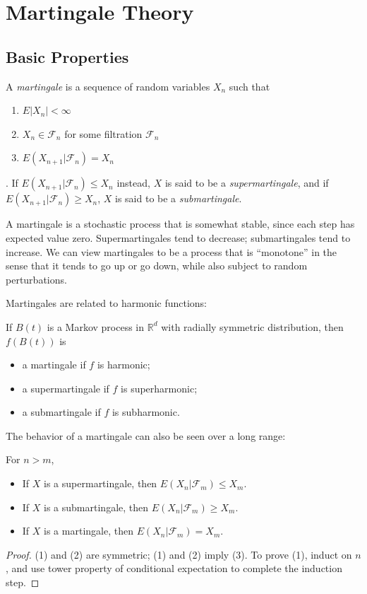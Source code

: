 \section{Martingale Theory}
\subsection{Basic Properties}

\begin{definition}[Martingale]
	\label{defn:martingale}
	A \textit{martingale} is a sequence of random variables $X_n$ such that
	\begin{enumerate}
		\item $E|X_n| < \infty $ 
		\item $X_n \in \mathcal{F}_n$ for some filtration $\mathcal{F}_n$
		\item $E(X_{n+1} | \mathcal{F}_n) = X_n$
	\end{enumerate}.
	If $E(X_{n+1}|\mathcal{F}_n) \le X_n$ instead, $X$ is said to be a \textit{supermartingale}, and if $E(X_{n+1}|\mathcal{F}_n) \ge X_n$, $X$ is said to be a  \textit{submartingale}.
\end{definition}
\begin{intuition}
	A martingale is a stochastic process that is somewhat stable, since each step has expected value zero. Supermartingales tend to decrease; submartingales tend to increase. We can view martingales to be a process that is ``monotone'' in the sense that it tends to go up or go down, while also subject to random perturbations.
\end{intuition}

Martingales are related to harmonic functions:
\begin{proposition}
	\label{prop:martingaleHarmonic}
	If $B(t)$ is a Markov process in $\mathbb{R}^d$ with radially symmetric distribution, then $f(B(t))$ is
	\begin{itemize}
		\item a martingale if $f$ is harmonic;
		\item a supermartingale if $f$ is superharmonic;
		\item a submartingale if $f$ is subharmonic.
	\end{itemize}
\end{proposition}

The behavior of a martingale can also be seen over a long range:
\begin{proposition}
	For $n > m$,
	\begin{itemize}
		\item If $X$ is a supermartingale, then $E(X_n | \mathcal{F}_m) \le X_m$.
		\item If $X$ is a submartingale, then $E(X_n | \mathcal{F}_m) \ge X_m$.
		\item If $X$ is a martingale, then $E(X_n | \mathcal{F}_m) = X_m$.
	\end{itemize}
\end{proposition}
\begin{proof}
	(1) and (2) are symmetric; (1) and (2) imply (3). To prove (1), induct on $n$, and use tower property of conditional expectation to complete the induction step.
\end{proof}

